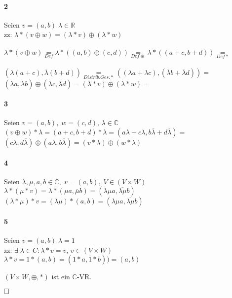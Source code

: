\documentclass[10pt,a4paper]{article}
\begin{document}
\paragraph{2}
Seien $ v= (a,b) \; \lambda \in \mathbb{R}$\\
zz: $\lambda *(v \oplus w) = (\lambda *v ) \oplus (\lambda * w) $\\\\
$ \lambda * (v \oplus w) \underset{Def}{=} \lambda * ((a,b)\oplus (c,d)) \underset{Def \oplus}{=} \lambda *((a+c, b+d)) \underset{Def *}{=}$\\\\
$ (\lambda(a+c), \overline{\lambda}(b+d)) \underset{Distrib.Ges.*}{=}((\lambda a+\lambda c), (\overline{\lambda}b+\overline{\lambda}d))= $\\
$ (\lambda a, \overline{\lambda}b) \oplus (\lambda c,\overline{\lambda}d) = (\lambda *v ) \oplus (\lambda * w) =$
\begin{flushright} \checkmark \end{flushright}

\paragraph{3}
Seien $v =( a,b), \; w=(c,d), \, \lambda \in \mathbb{C}$\\
$(v \oplus w) * \lambda = (a+c,b+d)*\lambda = (a \lambda+c \lambda ,b\overline{\lambda}+d \overline{\lambda}) =$
$(c \lambda ,d \overline{\lambda}) \oplus (a \lambda,b\overline{\lambda}) =(v*\lambda ) \oplus (w*\lambda)$
\begin{flushright} \checkmark \end{flushright}

\paragraph{4}
Seien $ \lambda,\mu,a,b \in \mathbb{C}, \; v = (a,b), \; V \in (V\times W)$\\
$ \lambda*(\mu*v)=\lambda*(\mu a,\overline{\mu}b) = (\lambda \mu a, \overline{\lambda\mu} b)$\\
$(\lambda * \mu )*v = (\lambda\mu)*(a,b)=(\lambda\mu a, \overline{\lambda\mu} b)$
\begin{flushright} \checkmark \end{flushright}

\paragraph{5}
Seien $v=(a,b) \; \lambda = 1$\\
zz: $ \exists\; \lambda \in C : \lambda*v = v $, $v \in (V \times W)$\\
$\lambda * v = 1 * (a,b) = (1*a, \overline{1}*b))= (a,b) $
\begin{flushright} \checkmark \end{flushright}

$(V\times W, \oplus ,*)$ ist ein $\mathbb{C}$-VR.
 \begin{flushright} $\hfill \Box$ \end{flushright}
\end{document}
